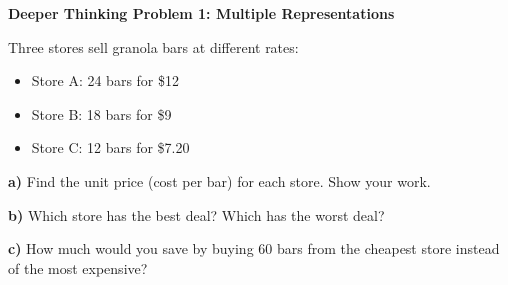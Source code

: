 \documentclass[12pt, letterpaper, fleqn]{article}
\begin{document}
\begin{tcolorbox}[colback=white!15, colframe=black, boxrule=1.5pt, arc=4mm, left=6mm, right=6mm, top=5mm, bottom=5mm]

\textbf{Deeper Thinking Problem 1: Multiple Representations}

\medskip

\noindent
Three stores sell granola bars at different rates:
\begin{itemize}
    \item Store A: 24 bars for \$12
    \item Store B: 18 bars for \$9
    \item Store C: 12 bars for \$7.20
\end{itemize}
\vspace{1cm}

\noindent
\textbf{a)} Find the unit price (cost per bar) for each store. Show your work.

\vspace{4cm}

\noindent
\textbf{b)} Which store has the best deal? Which has the worst deal?

\vspace{4cm}

\noindent
\textbf{c)} How much would you save by buying 60 bars from the cheapest store instead of the most expensive?

\vspace{4cm}

\end{tcolorbox}

\newpage
\end{document}
